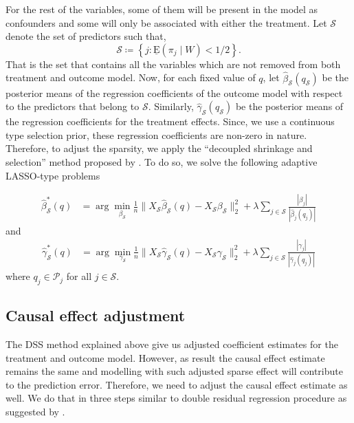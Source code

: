 \documentclass[oribibl]{llncs}
\newcommand{\lexp}{\underline{\text{E}}}
\begin{document}
For the rest of the variables, some of them will be present
in the model as confounders and some will only be associated with
either the treatment. Let $\mathcal{S}$ denote the set of
predictors such that,
\begin{equation}
	\mathcal{S}\coloneqq
	\left\{j : \lexp(\pi_j\mid W) < 1/2\right\}.
\end{equation}
That is the set that contains all the variables which are not
removed from both treatment and outcome model. Now, for
each fixed value of $q$,
let $\hat{\beta}_{\mathcal{S}}(q_{\mathcal{S}})$ be the posterior means of the regression coefficients of the outcome model with respect to
the predictors that belong to $\mathcal{S}$. Similarly,
$\hat{\gamma}_{\mathcal{S}}(q_{\mathcal{S}})$ be the posterior means of the regression
coefficients for the treatment effects. Since, we use a continuous type
selection prior, these regression coefficients are non-zero in nature.
Therefore, to adjust the sparsity, we apply the 
``decoupled shrinkage and selection'' method proposed by \cite{hahn2015}. To do so, we solve the following adaptive LASSO-type \cite{Zou2006}
problems

\begin{align}
	\hat{\beta}^*_{\mathcal{S}}(q) &= 
	\arg\min_{\beta_{\mathcal{S}}} \frac{1}{n}\|X_{\mathcal{S}}\hat{\beta}_{\mathcal{S}}(q)
	- X_{\mathcal{S}} \beta_{\mathcal{S}}\|_2^2 + \lambda\sum_{j\in\mathcal{S}} 
	\frac{|\beta_j|}{|\hat{\beta}_j(q_j)|}
\end{align}
and
\begin{align}
	\hat{\gamma}^*_{\mathcal{S}}(q) &= 
	\arg\min_{\gamma_{\mathcal{S}}} \frac{1}{n}\|X_{\mathcal{S}}\hat{\gamma}_{\mathcal{S}}(q)
	- X_{\mathcal{S}} \gamma_{\mathcal{S}}\|_2^2 + \lambda\sum_{j\in\mathcal{S}} 
	\frac{|\gamma_j|}{|\hat{\gamma}_j(q_j)|}
\end{align}
where $q_{j}\in \mathcal{P}_{j}$ for all $j\in\mathcal{S}$.

\iftrue
\subsection{Causal effect adjustment} The DSS method explained
above give us adjusted coefficient estimates for the treatment
and outcome model. However, as result the causal effect estimate
remains the same and modelling with such adjusted sparse effect 
will contribute to the prediction error. Therefore, we need to 
adjust the causal effect estimate as well. We do that in three steps
similar to double residual regression procedure as suggested by
\cite{robinson1988}.
\end{document}
